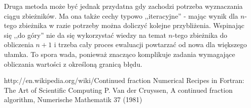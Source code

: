 \documentclass[11pt,leqno]{article}
\begin{document}
Druga metoda może być jednak przydatna gdy zachodzi potrzeba wyznaczania ciągu zbieżników. Ma ona także cechy typowo ,,iteracyjne'' - mając wynik dla $n$-tego zbieżnika w razie potrzeby można doliczyć kolejne przybliżenia. Wspinając się ,,do góry'' nie da się wykorzystać wiedzy na temat $n$-tego zbieżnika do obliczenia $n+1$ i trzeba cały proces ewaluacji powtarzać od nowa dla większego ułamka. To spora wada, ponieważ znacząco komplikuje zadania wymagające obliczania wartości z określoną granicą błędu.

\begin{thebibliography}{99}
 http://en.wikipedia.org/wiki/Continued fraction
 Numerical Recipes in Fortran: The Art of Scientific Computing
 P. Van der Cruyssen, A continued fraction algorithm, Numerische Mathematik 37 (1981)
\end{thebibliography}
\end{document}
